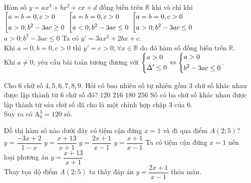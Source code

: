 \begin{ex}%
	Hàm số $y=ax^3+bx^2+cx+d$ đồng biến trên $\mathbb{R}$ khi và chỉ khi
	\choice
		{$\left[\begin{aligned}& a=b=0,c>0 \\ & a>0;b^2-3ac\ge 0\end{aligned}\right.$}
		{$\left[\begin{aligned}& a=b=0,c>0 \\ & a<0;b^2-3ac\le 0\end{aligned}\right.$}
		{\True $\left[\begin{aligned}& a=b=0,c>0 \\ & a>0;b^2-3ac\le 0\end{aligned}\right.$}
		{$a>0;b^2-3ac\le 0$}
	\loigiai
		{
			Ta có $y'=3ax^2+2bx+c$.\\
			Khi $a=0,b=0,c>0$ thì $y'=c>0,\forall x\in\mathbb{R}$ do đó hàm số đồng biến trên $\mathbb{R}$.\\
			Khi $a\neq 0$, yêu cầu bài toán tương đương với $\left\{\begin{aligned}&a>0\\&\Delta'\leq 0\end{aligned}\right.\Leftrightarrow\left\{\begin{aligned}&a>0\\&b^2-3ac\leq 0\end{aligned}\right.$.
		}
\end{ex}

\begin{ex}%
	Cho $6$ chữ số $4,5,6,7,8,9.$ Hỏi có bao nhiêu số tự nhiên gồm $3$ chữ số khác nhau được lập thành từ $6$ chữ số đó?
	\choice
		{\True $120$}
		{$216$}
		{$180$}
		{$256$}
	\loigiai
		{
			Số có ba chữ số khác nhau được lập thành từ sáu chữ số đã cho là một chỉnh hợp chập $3$ của $6$.\\
			Suy ra có $\mathrm{A}_6^3=120$ số.
		}
\end{ex}

\begin{ex}%
	Đồ thị hàm số nào dưới đây có tiệm cận đứng $x=1$ và đi qua điểm $A\left(2;5\right)$?
	\choice
		{$y=\dfrac{-3x+2}{1-x}$}
		{$y=\dfrac{x+13}{x+1}$}
		{\True $y=\dfrac{2x+1}{x-1}$}
		{$y=\dfrac{x+1}{x-1}$}
	\loigiai
		{
			Ta có tiệm cận đứng $x=1$ nên loại phương án $y = \dfrac{x+13}{x+1}$. \\
			Thay tọa độ điểm $A\left(2;5\right)$ ta thấy đáp án $y = \dfrac{2x+1}{x-1}$ thỏa mãn.
		}
\end{ex}

